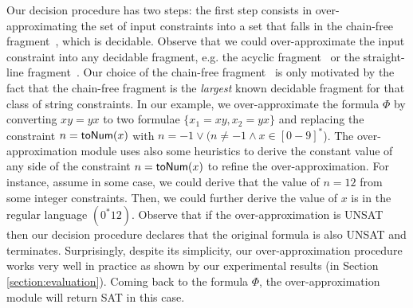 \documentclass[sigplan,review,anonymous]{acmart}\settopmatter{printfolios=true,printccs=false,printacmref=false}
\begin{document}
Our decision procedure has two steps: the first step consists in over-approximating the set of input constraints into a set that falls in the chain-free fragment~\cite{abdulla2019chain}, which is decidable. Observe that we could  over-approximate the input constraint into any decidable fragment, e.g. the acyclic fragment~\cite{abdulla2014string} or the straight-line fragment~\cite{chen2019decision}. Our choice of the  chain-free fragment~\cite{abdulla2019chain} is only motivated by the fact that the chain-free fragment is the {\em largest} known decidable fragment for that class of string constraints. In our example, we over-approximate the formula $\Phi$ by converting $xy=yx$ to two formulae $\{x_1=xy, x_2=yx\}$  and replacing the constraint $n=\mbox{\textsf{toNum}($x$)}$ with $n=-1 \vee (n\neq -1 \wedge x\in [0-9]^*$). The over-approximation module uses also some heuristics to derive the constant value of any side of the constraint $n=\mbox{\textsf{toNum}($x$)}$ to refine the over-approximation. For instance, assume in some case, we could derive that the value of $n=12$ from some integer constraints.  Then, we could further derive the value of $x$ is in the regular language $(0^*12)$. 
Observe that if the over-approximation is UNSAT then our decision procedure  declares that the original formula is also UNSAT and terminates. Surprisingly, despite its simplicity, our over-approximation procedure works very well in practice as shown by our experimental results  (in Section \ref{section:evaluation}). Coming back to the formula $\Phi$, the over-approximation module will  return SAT  in this case. 
\end{document}
